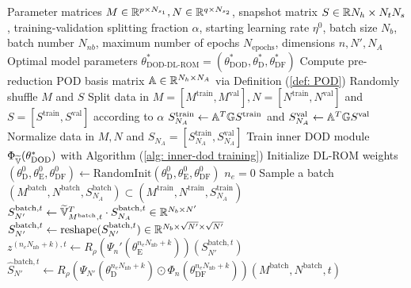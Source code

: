     \begin{algorithm}[H]
        \caption{DOD-DL-ROM training algorithm (offline)}
        \label{alg: dod-dl-rom training}
        \begin{algorithmic}[1]
        \Require Parameter matrices $M \in \mathbb{R}^{p\times N_{s_1}}, N \in \mathbb{R}^{q \times N_{s_2}}$, 
        snapshot matrix $S \in \mathbb{R}{N_h \times N_t N_s}$, 
        training-validation splitting fraction $\alpha$, starting learning rate $\eta^0$, 
        batch size $N_b$, batch number $N_{nb}$, maximum number of epochs $N_{\text{epochs}}$, dimensions $n, N', N_A$
        \Ensure Optimal model parameters $\theta_\text{DOD-DL-ROM}^* = (\theta_\text{DOD}^*, \theta_\text{D}^*,
        \theta_\text{DF}^*)$
        \State Compute pre-reduction POD basis matrix $\mathbb{A} \in \mathbb{R}^{N_h \times N_A}$ via Definition
        (\ref{def: POD})
        \State Randomly shuffle $M$ and $S$
        \State Split data in $M = [M^{\text{train}}, M^{\text{val}}], N=[N^\text{train}, N^\text{val}]$ and 
        $S = [S^{\text{train}}, S^{\text{val}}]$ according to $\alpha$
        \State $S_{N_A}^\text{train} \gets \mathbb{A}^T \mathbb{G} S^\text{train}$ and $S_{N_A}^\text{val} \gets \mathbb{A}^T \mathbb{G} S^\text{val}$
        \State Normalize data in $M, N$ and $S_{N_A} = [S_{N_A}^{\text{train}}, S_{N_A}^{\text{val}}]$
        \State Train inner DOD module $\Phi_{\widetilde{\mathbb{V}}}(\theta^*_\text{DOD})$ with Algorithm 
        (\ref{alg: inner-dod training})
        \State Initialize DL-ROM weights $(\theta^0_\text{D}, \theta^0_\text{E}, \theta^0_\text{DF}) 
        \gets \text{RandomInit}(\theta^0_\text{D}, \theta^0_\text{E}, \theta^0_\text{DF})$
        \State $n_e = 0$
            \State Sample a batch $(M^{\text{batch}}, N^{\text{batch}}, S_{N_A}^{\text{batch}}) \subset 
            (M^{\text{train}}, N^{\text{train}}, S_{N_A}^{\text{train}})$
                \State $S_{N'}^{\text{batch}, t} \gets \widetilde{\mathbb{V}}^T_{M^\text{batch}, t} \cdot 
                S_{N_A}^{\text{batch}, t} \in \mathbb{R}^{N_b \times N'}$
                \State $S_{N'}^{\text{batch}, t} \gets 
                \text{reshape}(S_{N'}^{\text{batch}, t}) \in 
                \mathbb{R}^{N_b \times \sqrt{N'} \times \sqrt{N'}}$
                \State $z^{(n_e N_{\text{nb}}+k), t} \gets
                R_\rho(\Psi_n'(\theta_\text{E}^{n_e N_{\text{nb}}+k}))(S_{N'}^{\text{batch}, t})$
                \State $\hat S_{N'}^{\text{batch}, t} \gets
                R_\rho(\Psi_{N'}(\theta_\text{D}^{n_e N_{\text{nb}}+k}) \odot \Phi_n(\theta_\text{DF}^{n_e N_{\text{nb}}+k}))(M^{\text{batch}}, N^\text{batch}, t)$

\end{algorithmic}
\end{algorithm}
